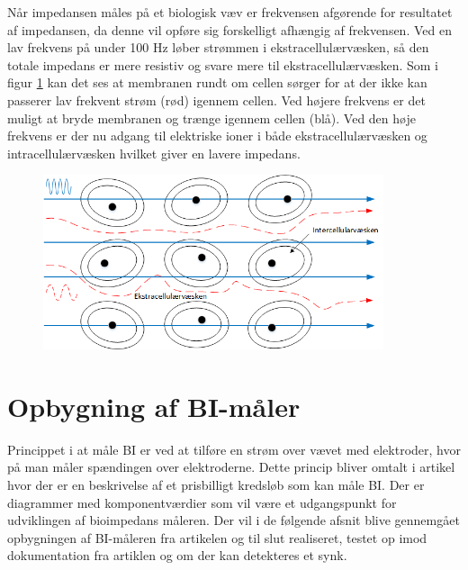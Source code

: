 Når impedansen måles på et biologisk væv er frekvensen afgørende for resultatet af impedansen, da denne vil opføre sig forskelligt afhængig af frekvensen. Ved en lav frekvens på under 100 Hz løber strømmen i ekstracellulærvæsken, så den totale impedans er mere resistiv og svare mere til ekstracellulærvæsken. Som i figur \ref{fig:celler} kan det ses at membranen rundt om cellen sørger for at der ikke kan passerer lav frekvent strøm (rød) igennem cellen. Ved højere frekvens er det muligt at bryde membranen og trænge igennem cellen (blå). Ved den høje frekvens er der nu adgang til elektriske ioner i både ekstracellulærvæsken og intracellulærvæsken hvilket giver en lavere impedans. 


\begin{figure}[H]
\centering
{\includegraphics[width=10cm]
{Figure/celler}}
\caption{}
\label{fig:celler}
\end{figure}










\section{Opbygning af BI-måler}
Princippet i at måle BI er ved at tilføre en strøm over vævet med elektroder, hvor på man måler spændingen over elektroderne. Dette princip bliver omtalt i artikel \citep{Aroom2009} hvor der er en beskrivelse af et prisbilligt kredsløb som kan måle BI. Der er diagrammer med komponentværdier som vil være et udgangspunkt for udviklingen af bioimpedans måleren. Der vil i de følgende afsnit blive gennemgået opbygningen af BI-måleren fra artikelen og til slut realiseret, testet op imod dokumentation fra artiklen og om der kan detekteres et synk. 



